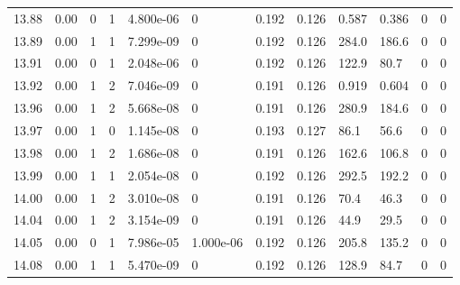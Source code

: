 \documentclass[preview]{standalone}
\begin{document}
{{{{{{{{{{\begin{tabular}{L{1.2cm}C{1.2cm} C{0.3cm}C{0.5cm} C{1.4cm}C{1.4cm} C{1.4cm}C{1.4cm} C{1.6cm}C{1.6cm} C{1.6cm}C{1.6cm}}
  13.88  &  0.00  & 0     &  1 &  4.800e-06  & 0  &  0.192&   0.126& 0.587 & 0.386   &  0 & 0  \\ 
  13.89  &  0.00  & 1     &  1 &  7.299e-09  & 0  &  0.192&   0.126& 284.0 & 186.6   &  0 & 0  \\ 
  13.91  &  0.00  & 0     &  1 &  2.048e-06  & 0  &  0.192&   0.126& 122.9 & 80.7   &  0 & 0  \\ 
  13.92  &  0.00  & 1     &  2 &  7.046e-09  & 0  &  0.191&   0.126& 0.919 & 0.604   &  0 & 0  \\ 
  13.96  &  0.00  & 1     &  2 &  5.668e-08  & 0  &  0.191&   0.126& 280.9 & 184.6   &  0 & 0  \\ 
  13.97  &  0.00  & 1     &  0 &  1.145e-08  & 0  &  0.193&   0.127& 86.1 & 56.6   &  0 & 0  \\ 
  13.98  &  0.00  & 1     &  2 &  1.686e-08  & 0  &  0.191&   0.126& 162.6 & 106.8   &  0 & 0  \\ 
  13.99  &  0.00  & 1     &  1 &  2.054e-08  & 0  &  0.192&   0.126& 292.5 & 192.2   &  0 & 0  \\ 
  14.00  &  0.00  & 1     &  2 &  3.010e-08  & 0  &  0.191&   0.126& 70.4 & 46.3   &  0 & 0  \\ 
  14.04  &  0.00  & 1     &  2 &  3.154e-09  & 0  &  0.191&   0.126& 44.9 & 29.5   &  0 & 0  \\ 
  14.05  &  0.00  & 0     &  1 &  7.986e-05  & 1.000e-06  &  0.192&   0.126& 205.8 & 135.2   &  0 & 0  \\ 
  14.08  &  0.00  & 1     &  1 &  5.470e-09  & 0  &  0.192&   0.126& 128.9 & 84.7   &  0 & 0  \\ 
\hline 
\end{tabular} 

}}}}}}}}}}
\end{document}
